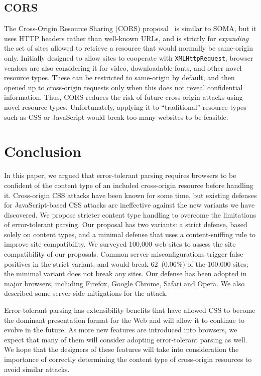 \documentclass{acm_proc_article-sp}
\begin{document}
\subsection{CORS}
The Cross-Origin Resource Sharing (CORS) proposal~\cite{cors} is
similar to SOMA, but it uses HTTP headers rather than well-known URLs,
and is strictly for \emph{expanding} the set of sites allowed to
retrieve a resource that would normally be same-origin only.
Initially designed to allow sites to cooperate with
\texttt{XMLHttpRequest}, browser vendors are also considering it for
video, downloadable fonts, and other novel resource types.  These can
be restricted to same-origin by default, and then opened up to
cross-origin requests only when this does not reveal confidential
information.  Thus, CORS reduces the risk of future cross-origin
attacks using novel resource types.  Unfortunately, applying it to
“traditional” resource types such as CSS or JavaScript would break too
many websites to be feasible.

\section{Conclusion} \label{sec:conclusion}
In this paper, we argued that error-tolerant parsing requires browsers to be
confident of the content type of an included cross-origin resource before
handling it. Cross-origin CSS attacks have been known for some time, but
existing defenses for JavaScript-based CSS attacks are ineffective against
the new variants we have discovered. We propose stricter content type handling
to overcome the limitations of error-tolerant parsing. Our proposal has
two variants: a strict defense, based solely on content
types, and a minimal defense that uses a content-sniffing rule to improve
site compatibility.  We surveyed 100,000 web sites to assess the site
compatibility of our proposals.  Common server misconfigurations
trigger false positives in the strict variant, and would break
62~(0.06\%) of the 100,000 sites; the minimal variant does not break
any sites.  Our defense has been adopted in major browsers, including
Firefox, Google Chrome, Safari and Opera.
We also described some server-side mitigations for the attack.

Error-tolerant parsing has extensibility benefits that have allowed CSS to
become the dominant presentation format for the Web and will allow it to
continue to evolve in the future. As more new features are introduced into
browsers, we expect that many of them will consider adopting error-tolerant parsing as well. We hope that the designers of these features will
take into consideration the importance of correctly determining the content
type of cross-origin resources to avoid similar attacks.
\end{document}
